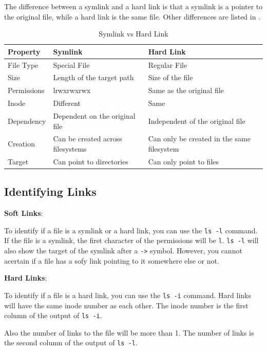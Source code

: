 The difference between a symlink and a hard link is that a symlink is a pointer to the original file, while a hard link is the same file.
Other differences are listed in .

\begin{table}[hb]
\caption{Symlink vs Hard Link}
\begin{tabular}{ l l l }
  \toprule
  Property & Symlink & Hard Link \\
 \midrule
  File Type & Special File & Regular File \\
  Size & Length of the target path & Size of the file \\
  Permissions & lrwxrwxrwx & Same as the original file \\
  Inode & Different & Same \\
  Dependency & Dependent on the original file & Independent of the original file \\
  Creation & Can be created across filesystems & Can only be created in the same filesystem \\
  Target & Can point to directories & Can only point to files \\
 \bottomrule
 \end{tabular}
\end{table}

\subsection{Identifying Links}

\textbf{Soft Links}:

To identify if a file is a symlink or a hard link, you can use the \texttt{ls -l} command.
If the file is a symlink, the first character of the permissions will be \texttt{l}.
\texttt{ls -l} will also show the target of the symlink after a \texttt{->} symbol.
However, you cannot acertain if a file has a sofy link pointing to it somewhere else or not.

\textbf{Hard Links}:

To identify if a file is a hard link, you can use the \texttt{ls -i} command.
Hard links will have the same inode number as each other.
The inode number is the first column of the output of \texttt{ls -i}.

Also the number of links to the file will be more than 1.
The number of links is the second
column of the output of \texttt{ls -l}.


